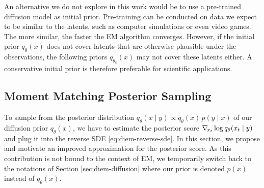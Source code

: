An alternative we do not explore in this work would be to use a pre-trained diffusion model as initial prior. Pre-training can be conducted on data we expect to be similar to the latents, such as computer simulations or even video games. The more similar, the faster the EM algorithm converges. However, if the initial prior $q_0(x)$ does not cover latents that are otherwise plausible under the observations, the following priors $q_{\theta_k}(x)$ may not cover these latents either. A conservative initial prior is therefore preferable for scientific applications.

\subsection{Moment Matching Posterior Sampling} \label{sec:diem-mmps}

To sample from the posterior distribution $q_\theta(x \mid y) \propto q_\theta(x) \, p(y \mid x)$ of our diffusion prior $q_\theta(x)$, we have to estimate the posterior score $\nabla_{\!{x_t}} \log q_\theta(x_t \mid y)$ and plug it into the reverse SDE \eqref{eq:diem-reverse-sde}. In this section, we propose and motivate an improved approximation for the posterior score. As this contribution is not bound to the context of EM, we temporarily switch back to the notations of Section \ref{sec:diem-diffusion} where our prior is denoted $p(x)$ instead of $q_\theta(x)$.

